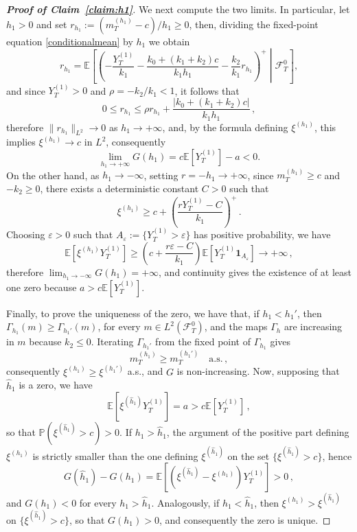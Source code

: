 \documentclass[11pt,a4paper]{article}
\begin{document}
\begin{proof}[\textup{\textbf{Proof of Claim~\ref{claim:h1}}}]
We next compute the two limits. In particular, let $h_1>0$ and set $r_{h_1}:=(m_T^{(h_1)}-c)/h_1\ge0$, then, dividing the fixed-point equation \textcolor{blue}{\eqref{conditionalmean}} by $h_1$ we obtain
\[
r_{h_1}=\mathbb E\left[\left(-\frac{Y_T^{(1)}}{k_1}-\frac{k_0+(k_1+k_2)c}{k_1h_1}-\frac{k_2}{k_1}r_{h_1}\right)^+\middle|\mathcal F_T^0\right],
\]
and since \(Y_T^{(1)}>0\) and \(\rho=-k_2/k_1<1\), it follows that
\[
0\le r_{h_1}\le \rho r_{h_1}+\frac{|k_0+(k_1+k_2)c|}{k_1h_1}\,,
\]
therefore \(\|r_{h_1}\|_{L^2}\to0\) as \(h_1\to+\infty\), and, by the formula defining \(\xi^{(h_1)}\), this implies \(\xi^{(h_1)}\to c\) in \(L^2\), consequently
\[
\lim_{h_1\to+\infty}G(h_1)=c\mathbb E[Y_T^{(1)}]-a<0.
\]
On the other hand, as \(h_1\to-\infty\), setting \(r=-h_1\to+\infty\), since \(m_T^{(h_1)}\ge c\) and \(-k_2\ge0\), there exists a deterministic constant \(C>0\) such that
\[
\xi^{(h_1)}\ge c+\left(\frac{rY_T^{(1)}-C}{k_1}\right)^+\,.
\]
Choosing \(\varepsilon>0\) such that \(A_\varepsilon:=\{Y_T^{(1)}>\varepsilon\}\) has positive probability, we have
\[
\mathbb E[\xi^{(h_1)}Y_T^{(1)}]
\ge
\left(c+\frac{r\varepsilon-C}{k_1}\right)\mathbb E[Y_T^{(1)}\mathbf 1_{A_\varepsilon}]\to+\infty\,,
\]
therefore \(\lim_{h_1\to-\infty}G(h_1)=+\infty\), and continuity gives the existence of at least one zero because \(a>c\mathbb E[Y_T^{(1)}]\).

Finally, to prove the uniqueness of the zero, we have that, if \(h_1<h_1'\), then \(\Gamma_{h_1}(m)\ge \Gamma_{h_1'}(m)\), for every \(m\in L^2(\mathcal F_T^0)\), and the maps \(\Gamma_h\) are increasing in \(m\) because \(k_2\le0\). Iterating \(\Gamma_{h_1'}\) from the fixed point of \(\Gamma_{h_1}\) gives
\[
m_T^{(h_1)}\ge m_T^{(h_1')}\quad\text{a.s.}\,,
\]
consequently \(\xi^{(h_1)}\ge \xi^{(h_1')}\) a.s., and \(G\) is non-increasing. Now, supposing that \(\widehat h_1\) is a zero, we have
\[
\mathbb E[\xi^{(\widehat h_1)}Y_T^{(1)}]=a>c\mathbb E[Y_T^{(1)}]\,,
\]
so that \(\mathbb P(\xi^{(\widehat h_1)}>c)>0\). If \(h_1>\widehat h_1\), the argument of the positive part defining \(\xi^{(h_1)}\) is strictly smaller than the one defining \(\xi^{(\widehat h_1)}\) on the set \(\{\xi^{(\widehat h_1)}>c\}\), hence
\[
G(\widehat h_1)-G(h_1)=\mathbb E[(\xi^{(\widehat h_1)}-\xi^{(h_1)})Y_T^{(1)}]>0\,,
\]
and \(G(h_1)<0\) for every \(h_1>\widehat h_1\). Analogously, if \(h_1<\widehat h_1\), then \(\xi^{(h_1)}>\xi^{(\widehat h_1)}\) on \(\{\xi^{(\widehat h_1)}>c\}\), so that \(G(h_1)>0\), and consequently the zero is unique.
\end{proof}
\end{document}
